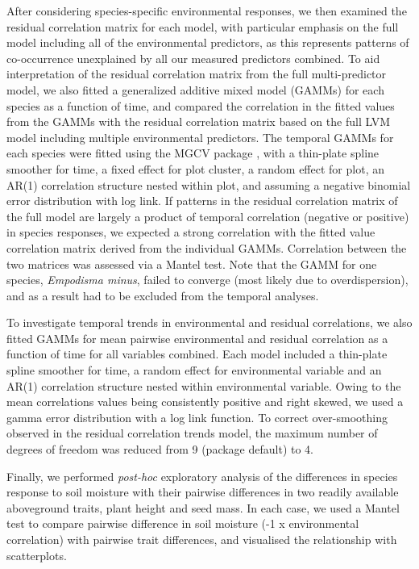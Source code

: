 After considering species-specific environmental responses, we then examined the residual correlation matrix for each model, with particular emphasis on the full model including all of the environmental predictors, as this represents patterns of co-occurrence unexplained by all our measured predictors combined. To aid interpretation of the residual correlation matrix from the full multi-predictor model, we also fitted a generalized additive mixed model (GAMMs) for each species as a function of time, and compared the correlation in the fitted values from the GAMMs with the residual correlation matrix based on the full LVM model including multiple environmental predictors. The temporal GAMMs for each species were fitted using the MGCV package \citep{wood2012mgcv}, with a thin-plate spline smoother for time, a fixed effect for plot cluster, a random effect for plot, an AR(1) correlation structure nested within plot, and assuming a negative binomial error distribution with log link. If patterns in the residual correlation matrix of the full model are largely a product of temporal correlation (negative or positive) in species responses, we expected a strong correlation with the fitted value correlation matrix derived from the individual GAMMs. Correlation between the two matrices was assessed via a Mantel test. Note that the GAMM for one species, \textit{Empodisma minus}, failed to converge (most likely due to overdispersion), and as a result had to be excluded from the temporal analyses.

To investigate temporal trends in environmental and residual correlations, we also fitted GAMMs for mean pairwise environmental and residual correlation as a function of time for all variables combined. Each model included a thin-plate spline smoother for time, a random effect for environmental variable and an AR(1) correlation structure nested within environmental variable. Owing to the mean correlations values being consistently positive and right skewed, we used a gamma error distribution with a log link function. To correct over-smoothing observed in the residual correlation trends model, the maximum number of degrees of freedom was reduced from 9 (package default) to 4.

Finally, we performed \textit{post-hoc} exploratory analysis of the differences in species response to soil moisture with their pairwise differences in two readily available aboveground traits, plant height and seed mass. In each case, we used a Mantel test to compare pairwise difference in soil moisture (-1 x environmental correlation) with pairwise trait differences, and visualised the relationship with scatterplots.    

